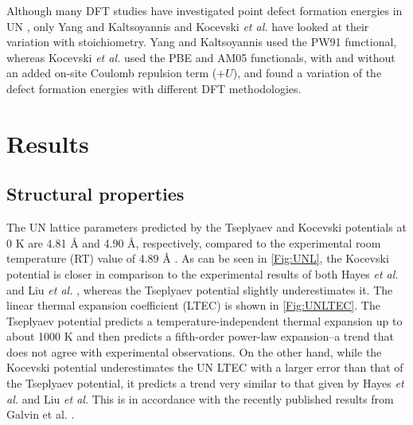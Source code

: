 \documentclass[preprint, 12pt]{elsarticle}
\begin{document}
Although many DFT studies have investigated point defect formation energies in UN \cite{Kotomin2007, Bocharov2011, Lan2013, Kuksin2016, Tseplyaev2016, Kocevski2022II}, only Yang and Kaltsoyannis \cite{Yang2021} and Kocevski \textit{et al.} \cite{Kocevski2022I} have looked at their variation with stoichiometry. Yang and Kaltsoyannis used the PW91 functional, whereas Kocevski \textit{et al.} used the PBE and AM05 functionals, with and without an added on-site Coulomb repulsion term ($+U$), and found a variation of the defect formation energies with different DFT methodologies.

\section{Results}

\subsection{Structural properties}

The UN lattice parameters predicted by the Tseplyaev and Kocevski potentials at 0 K are 4.81 {\AA} and 4.90 {\AA}, respectively, compared to the experimental room temperature (RT) value of 4.89 {\AA} \cite{Hayes1990I}. As can be seen in \cref{Fig:UNL}, the Kocevski potential is closer in comparison to the experimental results of both Hayes \textit{et al.} \cite{Hayes1990I} and Liu \textit{et al.} \cite{Liu2023}, whereas the Tseplyaev potential slightly underestimates it. The linear thermal expansion coefficient (LTEC) is shown in \cref{Fig:UNLTEC}. The Tseplyaev potential predicts a temperature-independent thermal expansion up to about 1000 K and then predicts a fifth-order power-law expansion--a trend that does not agree with experimental observations. On the other hand, while the Kocevski potential underestimates the UN LTEC with a larger error than that of the Tseplyaev potential, it predicts a trend very similar to that given by Hayes \textit{et al.} and Liu \textit{et al.} This is in accordance with the recently published results from Galvin et al. \cite{Galvin2023}.
\end{document}
